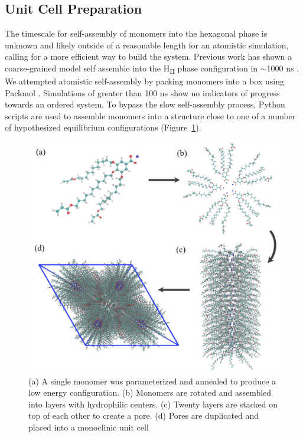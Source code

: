 \documentclass{article}
\begin{document}

  \subsection{Unit Cell Preparation}

  The timescale for self-assembly of monomers into the hexagonal phase is
  unknown and likely outside of a reasonable length for an atomistic simulation,
  calling for a more efficient way to build the system.  Previous work has shown
  a coarse-grained model self assemble into the H\textsubscript{II} phase
  configuration in $\sim$1000 ns \cite{mondal_self-assembly_2013}.  We
  attempted atomistic self-assembly by packing monomers into a box using Packmol
  \cite{martinez_packmol:_2009}.  Simulations of greater than 100 ns show no
  indicators of progress towards an ordered system. To bypass the slow
  self-assembly process, Python scripts are used to assemble monomers into a
  structure close to one of a number of hypothesized equilibrium configurations
  (Figure~\ref{fig:python}).

  \begin{figure}
	\centering
	\includegraphics[width=0.75\linewidth]{build.PNG} %
	\caption{(a) A single monomer was parameterized and annealed to produce a low energy
		configuration. (b) Monomers are rotated and assembled into layers with 
		hydrophilic centers. (c) Twenty layers are stacked on top of each other to create
		a pore. (d) Pores are duplicated and placed into a monoclinic unit cell}\label{fig:python}
  \end{figure}
  
\end{document}
